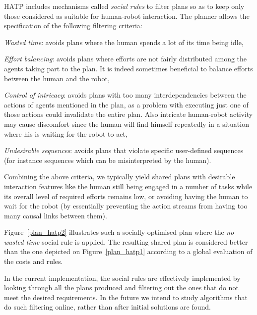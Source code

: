 \documentclass[preprint,3p,times]{elsarticle}
\begin{document}
HATP includes mechanisms called \emph{social rules} to filter plans so as to
keep only those considered as suitable for human-robot interaction. The planner
allows the specification of the following filtering criteria:

\emph{Wasted time}: avoids plans where the human spends a lot
of its time being idle,

\emph{Effort balancing}: avoids plans where efforts are
not fairly distributed among the agents taking part to the plan.  It is
indeed sometimes beneficial to balance efforts between the human and
the robot,

\emph{Control of intricacy}: avoids plans with too many interdependencies
between the actions of agents mentioned in the plan, as a problem with
executing just one of those actions could invalidate the entire
plan. Also intricate human-robot activity may cause discomfort since
the human will find himself repeatedly in a situation where his is
waiting for the robot to act,

\emph{Undesirable sequences}: avoids plans that violate specific user-defined
sequences (for instance sequences which can be misinterpreted by the human).

Combining the above criteria, we typically yield shared plans with desirable
interaction features like the human still being engaged in a number of tasks
while its overall level of required efforts remains low, or avoiding having the
human to wait for the robot (by essentially preventing the action streams from
having too many causal links between them).

Figure~\ref{plan_hatp2} illustrates such a socially-optimised plan where the
\emph{no wasted time} social rule is applied. The resulting shared plan is
considered better than the one depicted on Figure~\ref{plan_hatp1} according to
a global evaluation of the costs and rules.

In the current implementation, the social rules are effectively
implemented by looking through all the plans produced and filtering
out the ones that do not meet the desired requirements. In the
future we intend to study algorithms that do such filtering online,
rather than after initial solutions are found.
\end{document}

